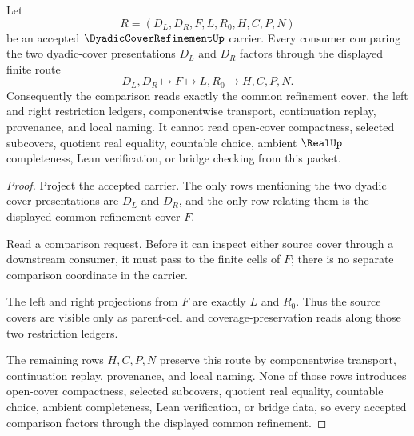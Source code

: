 \begin{theorem}
\label{thm:dyadic-cover-refinement-common-refinement-exactness}
Let
$$
R=(D_L,D_R,F,L,R_0,H,C,P,N)
$$
be an accepted $\DyadicCoverRefinementUp$ carrier. Every consumer comparing the two dyadic-cover presentations $D_L$ and $D_R$ factors through the displayed finite route
$$
D_L,D_R\longmapsto F\longmapsto L,R_0\longmapsto H,C,P,N .
$$
Consequently the comparison reads exactly the common refinement cover, the left and right restriction ledgers, componentwise transport, continuation replay, provenance, and local naming. It cannot read open-cover compactness, selected subcovers, quotient real equality, countable choice, ambient $\RealUp$ completeness, Lean verification, or bridge checking from this packet.
\end{theorem}
\begin{proof}
Project the accepted carrier. The only rows mentioning the two dyadic cover presentations are $D_L$ and $D_R$, and the only row relating them is the displayed common refinement cover $F$.

Read a comparison request. Before it can inspect either source cover through a downstream consumer, it must pass to the finite cells of $F$; there is no separate comparison coordinate in the carrier.

The left and right projections from $F$ are exactly $L$ and $R_0$. Thus the source covers are visible only as parent-cell and coverage-preservation reads along those two restriction ledgers.

The remaining rows $H,C,P,N$ preserve this route by componentwise transport, continuation replay, provenance, and local naming. None of those rows introduces open-cover compactness, selected subcovers, quotient real equality, countable choice, ambient completeness, Lean verification, or bridge data, so every accepted comparison factors through the displayed common refinement.
\end{proof}



